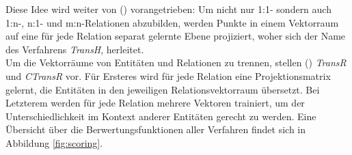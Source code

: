Diese Idee wird weiter von (\cite{wang2014knowledge}) vorangetrieben: Um nicht nur 1:1- sondern auch 1:n-, n:1- und m:n-Relationen
abzubilden, werden Punkte in einem Vektorraum auf eine für jede Relation separat gelernte Ebene projiziert, woher sich
der Name des Verfahrens \emph{TransH}, herleitet.\\
Um die Vektorräume von Entitäten und Relationen zu trennen, stellen (\cite{lin2015learning}) \emph{TransR} und \emph{CTransR}
vor. Für Ersteres wird für jede Relation eine Projektionsmatrix gelernt, die Entitäten in den jeweiligen Relationsvektorraum
übersetzt. Bei Letzterem werden für jede Relation mehrere Vektoren trainiert, um der Unterschiedlichkeit im Kontext
anderer Entitäten gerecht zu werden. Eine Übersicht über die Berwertungsfunktionen aller Verfahren findet sich in Abbildung
\ref{fig:scoring}.
